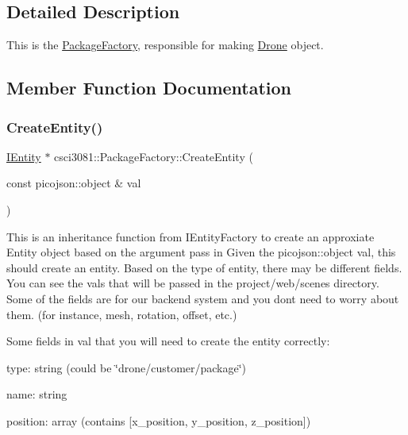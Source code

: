 \subsection{Detailed Description}
This is the \hyperlink{classcsci3081_1_1PackageFactory}{Package\+Factory}, responsible for making \hyperlink{classcsci3081_1_1Drone}{Drone} object. 

\subsection{Member Function Documentation}
\mbox{\label{classcsci3081_1_1PackageFactory_ac95467baa4ab68a96ce114548e0b5089}} 
\subsubsection{\texorpdfstring{Create\+Entity()}{CreateEntity()}}
{\footnotesize\ttfamily \hyperlink{classentity__project_1_1IEntity}{I\+Entity} $\ast$ csci3081\+::\+Package\+Factory\+::\+Create\+Entity (\begin{DoxyParamCaption}\item[{const picojson\+::object \&}]{val }\end{DoxyParamCaption})\hspace{0.3cm}{\ttfamily [virtual]}}



This is an inheritance function from I\+Entity\+Factory to create an approxiate Entity object based on the argument pass in Given the picojson\+::object val, this should create an entity. Based on the type of entity, there may be different fields. You can see the vals that will be passed in the project/web/scenes directory. Some of the fields are for our backend system and you don\textquotesingle{}t need to worry about them. (for instance, mesh, rotation, offset, etc.) 

Some fields in val that you will need to create the entity correctly\+:

type\+: string (could be \char`\"{}drone/customer/package\char`\"{})

name\+: string

position\+: array (contains \mbox{[}x\+\_\+position, y\+\_\+position, z\+\_\+position\mbox{]})

